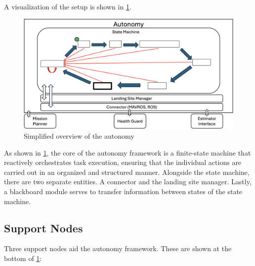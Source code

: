\documentclass{article}
\begin{document}
A visualization of the setup is shown in \cref{fig:autonomy}.

\begin{figure}[ht!]
    \centering
    \includegraphics[scale=0.155]{images/system_overview/autonomy.png}
    \caption{Simplified overview of the autonomy}
    \label{fig:autonomy}
\end{figure}

As shown in \cref{fig:autonomy}, the core of the autonomy framework is a finite-state machine that reactively orchestrates task execution, ensuring that the individual actions are carried out in an organized and structured manner. Alongside the state machine, there are two separate entities. A connector and the landing site manager. Lastly, a blackboard module serves to transfer information between states of the state machine.

\subsection{Support Nodes}\label{subsec:sup_nodes}

Three support nodes aid the autonomy framework. These are shown at the bottom of \cref{fig:autonomy}:
\end{document}
